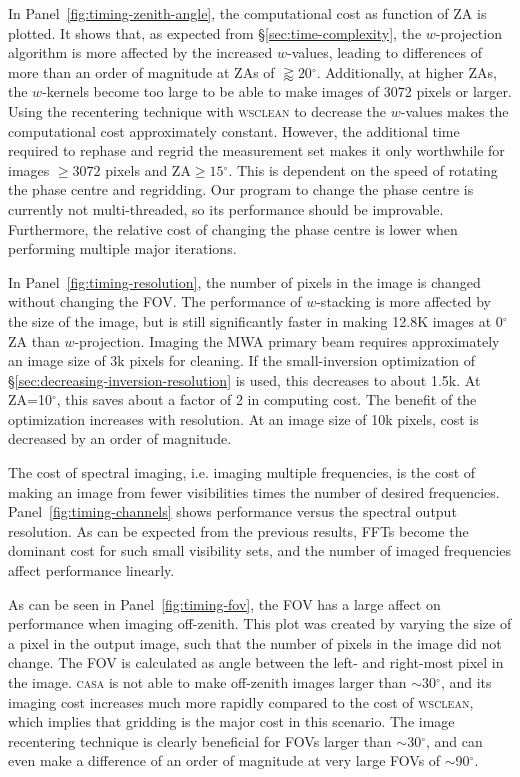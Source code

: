 \documentclass[useAMS,usenatbib]{mn2e}
\newcommand{\degree}{\ensuremath{^{\circ}}\xspace}
\begin{document}
In Panel~\ref{fig:timing-zenith-angle}, the computational cost as function of ZA is plotted. It shows that, as expected from \S\ref{sec:time-complexity}, the $w$-projection algorithm is more affected by the increased $w$-values, leading to differences of more than an order of magnitude at ZAs of $\gtrapprox 20$\degree. Additionally, at higher ZAs, the $w$-kernels become too large to be able to make images of 3072 pixels or larger. Using the recentering technique with \textsc{wsclean} to decrease the $w$-values makes the computational cost approximately constant. However, the additional time required to rephase and regrid the measurement set makes it only worthwhile for images $\ge3072$ pixels and $\textrm{ZA}\ge15\degree$. This is dependent on the speed of rotating the phase centre and regridding. Our program to change the phase centre is currently not multi-threaded, so its performance should be improvable. Furthermore, the relative cost of changing the phase centre is lower when performing multiple major iterations.

In Panel~\ref{fig:timing-resolution}, the number of pixels in the image is changed without changing the FOV. The performance of $w$-stacking is more affected by the size of the image, but is still significantly faster in making 12.8K images at 0\degree ZA than $w$-projection. Imaging the MWA primary beam requires approximately an image size of 3k pixels for cleaning. If the small-inversion optimization of \S\ref{sec:decreasing-inversion-resolution} is used, this decreases to about 1.5k. At ZA=10\degree, this saves about a factor of 2 in computing cost. The benefit of the optimization increases with resolution. At an image size of 10k pixels, cost is decreased by an order of magnitude.

The cost of spectral imaging, i.e. imaging multiple frequencies, is the cost of making an image from fewer visibilities times the number of desired frequencies. Panel~\ref{fig:timing-channels} shows performance versus the spectral output resolution. As can be expected from the previous results, FFTs become the dominant cost for such small visibility sets, and the number of imaged frequencies affect performance linearly.

As can be seen in Panel~\ref{fig:timing-fov}, the FOV has a large affect on performance when imaging off-zenith. This plot was created by varying the size of a pixel in the output image, such that the number of pixels in the image did not change. The FOV is calculated as angle between the left- and right-most pixel in the image. \textsc{casa} is not able to make off-zenith images larger than $\sim$30\degree, and its imaging cost increases much more rapidly compared to the cost of \textsc{wsclean}, which implies that gridding is the major cost in this scenario. The image recentering technique is clearly beneficial for FOVs larger than $\sim$30\degree, and can even make a difference of an order of magnitude at very large FOVs of $\sim$90\degree.
\end{document}

